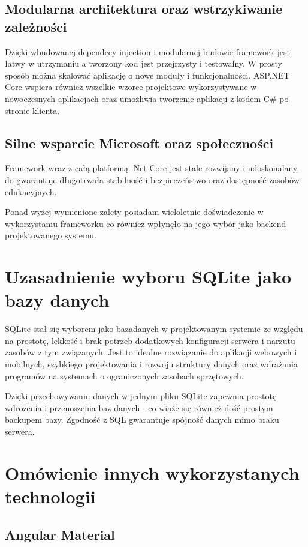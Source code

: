 \subsection{Modularna architektura oraz wstrzykiwanie zależności}
Dzięki wbudowanej dependecy injection i modularnej budowie framework jest łatwy w utrzymaniu a tworzony kod jest przejrzysty i testowalny. W prosty sposób można skalować aplikację o nowe moduły i funkcjonalności.
ASP.NET Core wspiera również wszelkie wzorce projektowe wykorzystywane w nowoczesnych aplikacjach oraz umożliwia tworzenie aplikacji z kodem C# po stronie klienta.

\subsection{Silne wsparcie Microsoft oraz społeczności}
Framework wraz z całą platformą .Net Core jest stale rozwijany i udoskonalany, do gwarantuje długotrwała stabilność i bezpieczeństwo oraz dostępność zasobów edukacyjnych.

Ponad wyżej wymienione zalety posiadam wieloletnie doświadczenie w wykorzystaniu frameworku co również wpłynęło na jego wybór jako backend projektowanego systemu.

\section{Uzasadnienie wyboru SQLite jako bazy danych}

SQLite stał się wyborem jako bazadanych w projektowanym systemie ze względu na prostotę, lekkość i brak potrzeb dodatkowych konfiguracji serwera i narzutu zasobów z tym związanych. Jest to idealne rozwiązanie do aplikacji webowych i mobilnych, szybkiego projektowania i rozwoju struktury danych oraz wdrażania programów na systemach o ograniczonych zasobach sprzętowych.

Dzięki przechowywaniu danych w jednym pliku SQLite zapewnia prostotę wdrożenia i przenoszenia baz danych - co wiąże się również dość prostym backupem bazy. Zgodność z SQL gwarantuje spójność danych mimo braku serwera.

\section{Omówienie innych wykorzystanych technologii}

\subsection{Angular Material}

